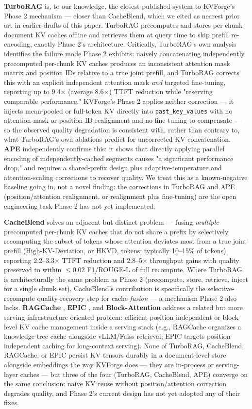 \documentclass[10pt,twocolumn]{article}
\begin{document}
\textbf{TurboRAG} \cite{ref34} is, to our knowledge, the closest published system to KVForge's Phase 2 mechanism --- closer than CacheBlend, which we cited as nearest prior art in earlier drafts of this paper. TurboRAG precomputes and stores per-chunk document KV caches offline and retrieves them at query time to skip prefill re-encoding, exactly Phase 2's architecture. Critically, TurboRAG's own analysis identifies the failure mode Phase 2 exhibits: naively concatenating independently precomputed per-chunk KV caches produces an inconsistent attention mask matrix and position IDs relative to a true joint prefill, and TurboRAG corrects this with an explicit independent attention mask \textit{and} targeted fine-tuning, reporting up to 9.4$\times$ (average 8.6$\times$) TTFT reduction while "reserving comparable performance." KVForge's Phase 2 applies neither correction --- it injects mean-pooled or full-token KV directly into \texttt{past\_key\_values} with no attention-mask or position-ID realignment and no fine-tuning to compensate --- so the observed quality degradation is consistent with, rather than contrary to, what TurboRAG's own ablations predict for uncorrected KV concatenation. \textbf{APE} \cite{ref38} independently confirms this: it shows that directly applying parallel encoding of independently-cached segments causes "a significant performance drop," and requires a shared-prefix design plus adaptive-temperature and attention-scaling corrections to recover quality. We treat this as a known-negative baseline going in, not a novel finding: the corrections in TurboRAG and APE (position/attention realignment, or realignment plus fine-tuning) are the open engineering task Phase 2 has not yet implemented.


\textbf{CacheBlend} \cite{ref20} solves an adjacent but distinct problem --- fusing \textit{multiple} precomputed per-chunk KV caches that do not share a prefix by selectively recomputing the subset of tokens whose attention deviates most from a true joint prefill (High-KV-Deviation, or HKVD, tokens; typically 10--15\% of tokens), reporting 2.2--3.3$\times$ TTFT reduction and 2.8--5$\times$ throughput gains with quality preserved to within $\leq$0.02 F1/ROUGE-L of full recompute. Where TurboRAG is architecturally the same problem as Phase 2 (precompute, store, retrieve, inject for a single chunk set), CacheBlend's contribution is specifically the selective-recompute quality-recovery step for cache \textit{fusion} --- a mechanism Phase 2 also lacks. \textbf{RAGCache} \cite{ref39}, \textbf{EPIC} \cite{ref35}, and \textbf{Block-Attention} address a related but more serving-infrastructure-oriented problem: efficient position-independent or block-level KV cache management inside a serving stack (e.g., RAGCache organizes a knowledge-tree cache alongside vLLM/Faiss retrieval; EPIC targets position-independent caching for long-context serving). None of TurboRAG, CacheBlend, RAGCache, or EPIC persist KV tensors durably in a document-level store alongside embeddings the way KVForge does --- they are in-process or serving-layer caches --- but three of the four (TurboRAG, CacheBlend, APE) converge on the same conclusion: naive KV reuse without position/attention correction degrades quality, and Phase 2's current design has not yet adopted any of their fixes.
\end{document}
